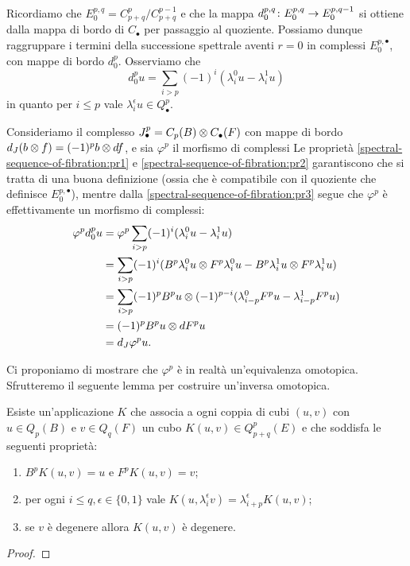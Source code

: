 Ricordiamo che $E^{p,q}_0=C^p_{p+q}/C^{p-1}_{p+q}$ e che la mappa $d^{p,q}_0\colon E^{p,q}_0\to E^{p,q-1}_0$ si ottiene dalla mappa di bordo di $C_\bullet$ per passaggio al quoziente. Possiamo dunque raggruppare i termini della successione spettrale aventi $r=0$ in complessi $E^{p,\bullet}_0$, con mappe di bordo $d^p_0$. Osserviamo che
$$
d^p_0u=\sum_{i>p}(-1)^i(\lambda^0_iu-\lambda^1_iu)
$$
in quanto per $i\le p$ vale $\lambda^\epsilon_iu\in Q^p_\bullet$.

Consideriamo il complesso $J^p_\bullet=C_p(B)\mathbin{\otimes} C_\bullet(F)$ con mappe di bordo $d_J(b\mathbin{\otimes} f)=(-1)^pb\mathbin{\otimes} df$, e sia $\varphi^p$ il morfismo di complessi
Le proprietà \ref{spectral-sequence-of-fibration:pr1} e \ref{spectral-sequence-of-fibration:pr2} garantiscono che si tratta di una buona definizione (ossia che è compatibile con il quoziente che definisce $E^{p,\bullet}_0$), mentre dalla \ref{spectral-sequence-of-fibration:pr3} segue che $\varphi^p$ è effettivamente un morfismo di complessi:
\begin{align*}
\varphi^pd^p_0u&=\varphi^p\sum_{i>p}(-1)^i(\lambda^0_iu-\lambda^1_iu)\\
&=\sum_{i>p}(-1)^i(B^p\lambda^0_iu\mathbin{\otimes} F^p\lambda^0_iu-B^p\lambda^1_iu\mathbin{\otimes} F^p\lambda^1_iu)\\
&=\sum_{i>p}(-1)^pB^pu\mathbin{\otimes}(-1)^{p-i}(\lambda^0_{i-p}F^pu-\lambda^1_{i-p}F^pu)\\
&=(-1)^pB^pu\mathbin{\otimes} dF^pu\\
&=d_J\varphi^pu.
\end{align*}

Ci proponiamo di mostrare che $\varphi^p$ è in realtà un'equivalenza omotopica. Sfrutteremo il seguente lemma per costruire un'inversa omotopica.

\begin{lemma}
Esiste un'applicazione $K$ che associa a ogni coppia di cubi $(u,v)$ con $u\in Q_p(B)$ e $v\in Q_q(F)$ un cubo $K(u,v)\in Q^p_{p+q}(E)$ e che soddisfa le seguenti proprietà:
\begin{enumerate}
\item\label{spectral-sequence-of-fibration-psi-construction:pr1} $B^pK(u,v)=u$ e $F^pK(u,v)=v$;
\item\label{spectral-sequence-of-fibration-psi-construction:pr2} per ogni $i\le q,\epsilon\in\{0,1\}$ vale $K(u,\lambda^\epsilon_iv)=\lambda^\epsilon_{i+p}K(u,v)$;
\item\label{spectral-sequence-of-fibration-psi-construction:pr3} se $v$ è degenere allora $K(u,v)$ è degenere.
\end{enumerate}
\end{lemma}
\begin{proof}

\end{proof}

